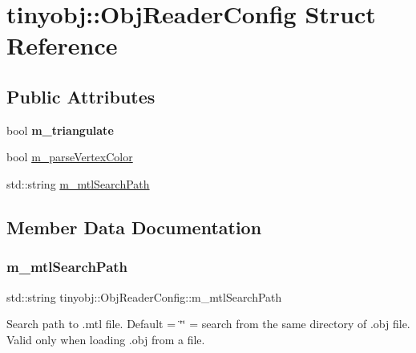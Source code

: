 \hypertarget{structtinyobj_1_1_obj_reader_config}{}\section{tinyobj\+::Obj\+Reader\+Config Struct Reference}
\label{structtinyobj_1_1_obj_reader_config}
\subsection*{Public Attributes}
\begin{DoxyCompactItemize}
\item 
\mbox{\label{structtinyobj_1_1_obj_reader_config_a4d86399c30df2a80b68a7fe6288f45ec}} 
bool {\bfseries m\+\_\+triangulate}
\item 
bool \mbox{\hyperlink{structtinyobj_1_1_obj_reader_config_afde0935a03f9b44d757dabaea70bd845}{m\+\_\+parse\+Vertex\+Color}}
\item 
std\+::string \mbox{\hyperlink{structtinyobj_1_1_obj_reader_config_a1db8d22c853a95c5e2bf74709d7efcd9}{m\+\_\+mtl\+Search\+Path}}
\end{DoxyCompactItemize}


\subsection{Member Data Documentation}
\mbox{\label{structtinyobj_1_1_obj_reader_config_a1db8d22c853a95c5e2bf74709d7efcd9}} 
\subsubsection{\texorpdfstring{m\_mtlSearchPath}{m\_mtlSearchPath}}
{\footnotesize\ttfamily std\+::string tinyobj\+::\+Obj\+Reader\+Config\+::m\+\_\+mtl\+Search\+Path}

Search path to .mtl file. Default = \char`\"{}\char`\"{} = search from the same directory of .obj file. Valid only when loading .obj from a file. \mbox{\label{structtinyobj_1_1_obj_reader_config_afde0935a03f9b44d757dabaea70bd845}} 
